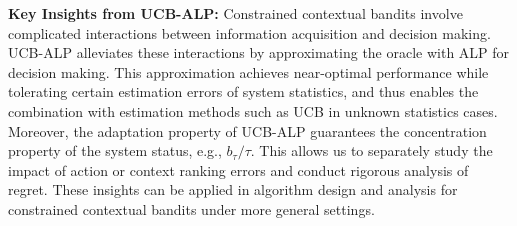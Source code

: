 {\textbf{Key Insights from UCB-ALP:}} Constrained contextual bandits involve complicated interactions between information acquisition and decision making. UCB-ALP alleviates these interactions by approximating the oracle with ALP for decision making. This approximation  achieves near-optimal performance while tolerating certain estimation errors of system statistics, and thus enables the combination with estimation methods such as UCB in unknown statistics cases. Moreover, the adaptation property of UCB-ALP guarantees the concentration property of the system status, e.g., $b_\tau/\tau$. This allows us to separately study the impact of action or context ranking errors and conduct rigorous analysis of regret. These insights can be applied in algorithm design and analysis for constrained contextual bandits under more general settings.


